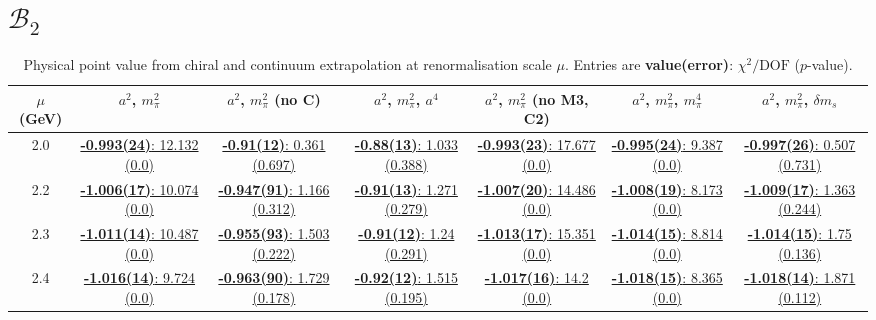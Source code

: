 \documentclass[12pt]{extarticle}
\begin{document}
\section{$\mathcal{B}_2$}
\begin{table}[h!]
\begin{center}
\begin{tabular}{|c|c|c|c|c|c|c|}
\hline
$\mu$ (GeV) & $a^2$, $m_\pi^2$& $a^2$, $m_\pi^2$ (no C)& $a^2$, $m_\pi^2$, $a^4$& $a^2$, $m_\pi^2$ (no M3, C2)& $a^2$, $m_\pi^2$, $m_\pi^4$& $a^2$, $m_\pi^2$, $\delta m_s$\\
\hline
2.0& \hyperlink{VVmAA/NPR/a2m2_20.pdf.1}{\textbf{-0.993(24)}: 12.132 (0.0)} & \hyperlink{VVmAA/NPR/a2m2noC_20.pdf.1}{\textbf{-0.91(12)}: 0.361 (0.697)} & \hyperlink{VVmAA/NPR/a2a4m2_20.pdf.1}{\textbf{-0.88(13)}: 1.033 (0.388)} & \hyperlink{VVmAA/NPR/a2m2mcut_20.pdf.1}{\textbf{-0.993(23)}: 17.677 (0.0)} & \hyperlink{VVmAA/NPR/a2m2m4_20.pdf.1}{\textbf{-0.995(24)}: 9.387 (0.0)} & \hyperlink{VVmAA/NPR/a2m2delm_20.pdf.1}{\textbf{-0.997(26)}: 0.507 (0.731)}\\
2.2& \hyperlink{VVmAA/NPR/a2m2_22.pdf.1}{\textbf{-1.006(17)}: 10.074 (0.0)} & \hyperlink{VVmAA/NPR/a2m2noC_22.pdf.1}{\textbf{-0.947(91)}: 1.166 (0.312)} & \hyperlink{VVmAA/NPR/a2a4m2_22.pdf.1}{\textbf{-0.91(13)}: 1.271 (0.279)} & \hyperlink{VVmAA/NPR/a2m2mcut_22.pdf.1}{\textbf{-1.007(20)}: 14.486 (0.0)} & \hyperlink{VVmAA/NPR/a2m2m4_22.pdf.1}{\textbf{-1.008(19)}: 8.173 (0.0)} & \hyperlink{VVmAA/NPR/a2m2delm_22.pdf.1}{\textbf{-1.009(17)}: 1.363 (0.244)}\\
2.3& \hyperlink{VVmAA/NPR/a2m2_23.pdf.1}{\textbf{-1.011(14)}: 10.487 (0.0)} & \hyperlink{VVmAA/NPR/a2m2noC_23.pdf.1}{\textbf{-0.955(93)}: 1.503 (0.222)} & \hyperlink{VVmAA/NPR/a2a4m2_23.pdf.1}{\textbf{-0.91(12)}: 1.24 (0.291)} & \hyperlink{VVmAA/NPR/a2m2mcut_23.pdf.1}{\textbf{-1.013(17)}: 15.351 (0.0)} & \hyperlink{VVmAA/NPR/a2m2m4_23.pdf.1}{\textbf{-1.014(15)}: 8.814 (0.0)} & \hyperlink{VVmAA/NPR/a2m2delm_23.pdf.1}{\textbf{-1.014(15)}: 1.75 (0.136)}\\
2.4& \hyperlink{VVmAA/NPR/a2m2_24.pdf.1}{\textbf{-1.016(14)}: 9.724 (0.0)} & \hyperlink{VVmAA/NPR/a2m2noC_24.pdf.1}{\textbf{-0.963(90)}: 1.729 (0.178)} & \hyperlink{VVmAA/NPR/a2a4m2_24.pdf.1}{\textbf{-0.92(12)}: 1.515 (0.195)} & \hyperlink{VVmAA/NPR/a2m2mcut_24.pdf.1}{\textbf{-1.017(16)}: 14.2 (0.0)} & \hyperlink{VVmAA/NPR/a2m2m4_24.pdf.1}{\textbf{-1.018(15)}: 8.365 (0.0)} & \hyperlink{VVmAA/NPR/a2m2delm_24.pdf.1}{\textbf{-1.018(14)}: 1.871 (0.112)}\\
\hline
\end{tabular}
\caption{Physical point value from chiral and continuum extrapolation at renormalisation scale $\mu$. Entries are \textbf{value(error)}: $\chi^2/\text{DOF}$ ($p$-value).}
\end{center}
\end{table}
\end{document}
